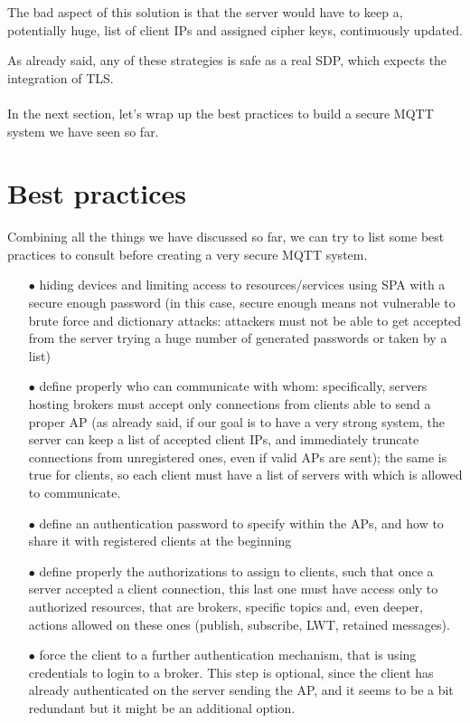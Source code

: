 \documentclass[12pt]{report}
\begin{document}
{{\begin{itemize}
The bad aspect of this solution is that the server would have to keep a, potentially huge, list of client IPs and assigned cipher keys, continuously updated.\\
\end{itemize}

As already said, any of these strategies is safe as a real SDP, which expects the integration of TLS.\\\\

In the next section, let's wrap up the best practices to build a secure MQTT system we have seen so far.\\

\section{Best practices}
\bigskip
Combining all the things we have discussed so far, we can try to list some best practices to consult before creating a very secure MQTT system.
\bigskip
\begin{itemize}
\setlength{\itemindent}{+4mm}
\item[$\bullet$] hiding devices and limiting access to resources/services using SPA with a secure enough password (in this case, secure enough means not vulnerable to brute force and dictionary attacks: attackers must not be able to get accepted from the server trying a huge number of generated passwords or taken by a list)
\item[$\bullet$] define properly who can communicate with whom: specifically, servers hosting brokers must accept only connections from clients able to send a proper AP (as already said, if our goal is to have a very strong system, the server can keep a list of accepted client IPs, and immediately truncate connections from unregistered ones, even if valid APs are sent); the same is true for clients, so each client must have a list of servers with which is allowed to communicate.
\item[$\bullet$] define an authentication password to specify within the APs, and how to share it with registered clients at the beginning
\item[$\bullet$] define properly the authorizations to assign to clients, such that once a server accepted a client connection, this last one must have access only to authorized resources, that are brokers, specific topics and, even deeper, actions allowed on these ones (publish, subscribe, LWT, retained messages).
\item[$\bullet$] force the client to a further authentication mechanism, that is using credentials to login to a broker. This step is optional, since the client has already authenticated on the server sending the AP, and it seems to be a bit redundant but it might be an additional option.

\end{itemize}}}
\end{document}
